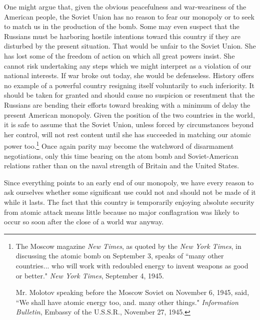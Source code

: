 One might argue that, given the obvious peacefulness and war-weariness of the American people, the Soviet Union has no reason to fear our monopoly or to seek to match us in the production of the bomb. Some may even suspect that the Russians must be harboring hostile intentions toward this country if they are disturbed by the present situation. That would be unfair to the Soviet Union. She has lost some of the freedom of action on which all great powers insist. She cannot risk undertaking any steps which we might interpret as a violation of our national interests. If war broke out today, she would be defenseless. History offers no example of a powerful country resigning itself voluntarily to such inferiority. It should be taken for granted and should cause no suspicion or resentment that the Russians are bending their efforts toward breaking with a minimum of delay the present American monopoly. Given the position of the two countries in the world, it is safe to assume that the Soviet Union, unless forced by circumstances beyond her control, will not rest content until she has succeeded in matching our atomic power too.\footnote{The Moscow magazine \textit{New Times}, as quoted by the \textit{New York Times}, in discussing the atomic bomb on September 3, speaks of ``many other countries... who will work with redoubled energy to invent weapons as good or better." \textit{New York Times}, September 4, 1945.

Mr. Molotov speaking before the Moscow Soviet on November 6, 1945, said, ``We shall have atomic energy too, and. many other things." \textit{Information Bulletin}, Embassy of the U.S.S.R., November 27, 1945.} Once again parity may become the watchword of disarmament negotiations, only this time bearing on the atom bomb and Soviet-American relations rather than on the naval strength of Britain and the United States.

Since everything points to an early end of our monopoly, we have every reason to ask ourselves whether some significant use could not and should not be made of it while it lasts. The fact that this country is temporarily enjoying absolute security from atomic attack means little because no major conflagration was likely to occur so soon after the close of a world war anyway.

